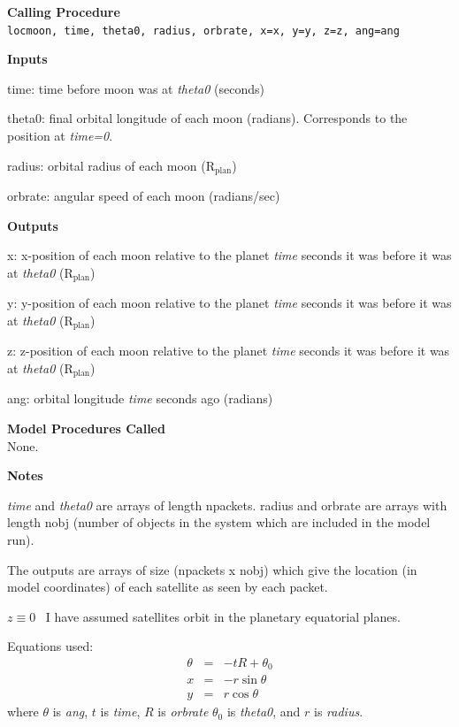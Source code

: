 \documentclass[11pt]{article}
\newcommand\descrip[1]{\textsf{\textbf{\large{#1}}}\\}
\newcommand\Rplan{R$_{\mathrm{plan}}$}
\begin{document}
\descrip{Calling Procedure}
\verb+locmoon, time, theta0, radius, orbrate, x=x, y=y, z=z, ang=ang+

\descrip{Inputs}
\begin{compactitem} \listup
\item time: time before moon was at \textit{theta0} (seconds)
\item theta0: final orbital longitude of each moon (radians). Corresponds to
the position at \textit{time=0}.
\item radius: orbital radius of each moon (\Rplan)
\item orbrate: angular speed of each moon (radians/sec)
\end{compactitem}

\descrip{Outputs}
\begin{compactitem} \listup
\item x: x-position of each moon relative to the planet \textit{time} seconds 
it was before it was at \textit{theta0} (\Rplan)
\item y: y-position of each moon relative to the planet \textit{time} seconds 
it was before it was at \textit{theta0} (\Rplan)
\item z: z-position of each moon relative to the planet \textit{time} seconds 
it was before it was at \textit{theta0} (\Rplan)
\item ang: orbital longitude \textit{time} seconds ago (radians)
\end{compactitem}

\descrip{Model Procedures Called}
None.

\descrip{Notes}
\begin{compactitem} \listup
\item \textit{time} and \textit{theta0} are arrays of length npackets. radius
and orbrate are arrays with length nobj (number of objects in the system which
are included in the model run).
\item The outputs are arrays of size (npackets x nobj) which give the location
(in model coordinates) of each satellite as seen by each packet.
\item $z \equiv 0$ \rarrow\ I have assumed satellites orbit in the planetary
equatorial planes.
\item Equations used:
  \begin{eqnarray}
  \theta & = & -t R + \theta_0 \\
  x & = & -r \sin\theta \\
  y & = & r \cos\theta 
  \end{eqnarray}
  where $\theta$ is \textit{ang}, $t$ is \textit{time}, $R$ is \textit{orbrate} 
  $\theta_0$ is \textit{theta0}, and $r$ is \textit{radius}.
\end{compactitem}
\end{document}
